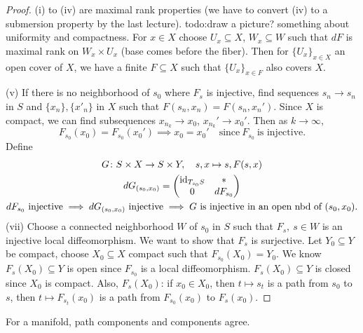 \begin{proof}
    (i) to (iv) are maximal rank properties (we have to convert (iv) to a submersion property by the last lecture). {\color{red}todo:draw a picture? something about uniformity and compactness}. For $x \in X$ choose $U_x \subseteq X$, $W_x \subseteq W$ such that $dF$ is maximal rank on $W_x \times U_x$ (base comes before the fiber). Then for $\{U_x\} _{x \in X}$ an open cover of $X$, we have a finite $F \subseteq X$ such that $\{U_x\} _{x \in F}$ also covers $X$.

    (v) If there is no neighborhood of $s_0$ where $F_s$ is injective, find sequences $s _n \to  s _n $ in $S$ and $\{x_n \} ,\{x'_n \} $ in $X$ such that $F(s _n ,x_n )=F(s_n ,x_n ')$. Since $X$ is compact, we can find subsequences $x_{n_k}\to x_0$, $x_{n_k}'\to x_0'$. Then as $k \to \infty$, \[
        F_{s_0}(x_0)=F_{s_0}(x_0')\implies x_0=x_0' \quad \text{since} \ F_{s_0} \ \text{is injective.}
    \] Define 
    \begin{gather*}
        G \colon S\times X \to S\times Y,\quad s,x \mapsto s,F(s,x)\\
        dG_{(s_0,x_0)}=
        \begin{pmatrix}
            \id_{T_{s_0}S} & * \\ 0 & dF_{s_0}
        \end{pmatrix}\\
        dF_{s_0} \ \text{injective} \implies dG_{(s_0,x_0)} \ \text{injective} \implies G \ \text{is injective in an open nbd of} \ (s_0,x_0).
    \end{gather*}
    (vii) Choose a connected neighborhood $W$ of $s_0$ in $S$ such that $F_s,\ s \in W$ is an injective local diffeomorphism. We want to show that $F_s$ is surjective. Let $Y_0 \subseteq Y$ be compact, choose $X_0 \subseteq X$ compact such that $F_{s_0}(X_0)=Y_0$. We know $F_{s}(X_0) \subseteq Y$ is open since $F_{s_0}$ is a local diffeomorphism. $F_{s}(X_0)\subseteq Y$ is closed since $X_0$ is compact. Also, $F_s(X_0)$: if $x_0 \in X_0$, then $t \mapsto s_t$ is a path from $s_0$ to $s$, then $t \mapsto F_{s_t}(x_0)$ is a path from $F_{s_0}(x_0)$ to $F_s(x_0)$.
\end{proof}
\begin{remark}
    For a manifold, path components and components agree.
\end{remark}


